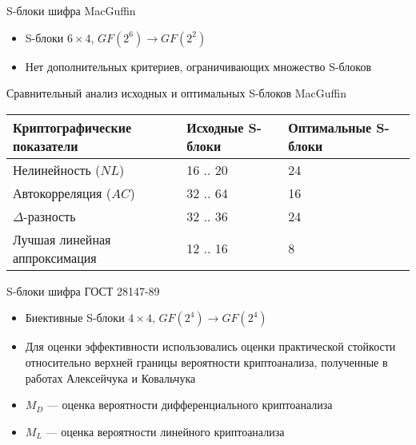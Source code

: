 \documentclass[12pt,unicode]{beamer}
\begin{document}
\begin{frame}{S-блоки шифра MacGuffin}

    \begin{itemize}
        
        \item S-блоки $6 \times 4$, $GF(2^6) \rightarrow GF(2^2)$
        \item Нет дополнительных критериев, ограничивающих множество S-блоков

    \end{itemize}

\end{frame}


\begin{frame}{Сравнительный анализ исходных и оптимальных S-блоков MacGuffin}

    \begin{table}
        \def\arraystretch{1.5}
        \begin{tabular}{ L{4.1cm} | L{2.7cm} | L{2.7cm} }
        \bf Криптографические показатели & \bf Исходные S-блоки & \bf Оптимальные S-блоки \\ \hline
        Нелинейность ($NL$) & 16 .. 20 & 24 \\ \hline
        Автокорреляция ($AC$) & 32 .. 64 & 16 \\ \hline
        $\Delta$-разность & 32 .. 36 & 24 \\ \hline
        Лучшая линейная аппроксимация & 12 .. 16 & 8 \\ \hline
        \end{tabular}
    \end{table}

\end{frame}

\begin{frame}{S-блоки шифра ГОСТ 28147-89}

    \begin{itemize}
        
        \item Биективные S-блоки $4 \times 4$, $GF(2^4) \rightarrow GF(2^4)$

        \item Для оценки эффективности использовались оценки практической
        стойкости относительно верхней границы вероятности криптоанализа,
        полученные в работах Алексейчука и Ковальчука

        \item $M_D$ --- оценка вероятности дифференциального криптоанализа

        \item $M_L$ --- оценка вероятности линейного криптоанализа

    \end{itemize}

\end{frame}
\end{document}
